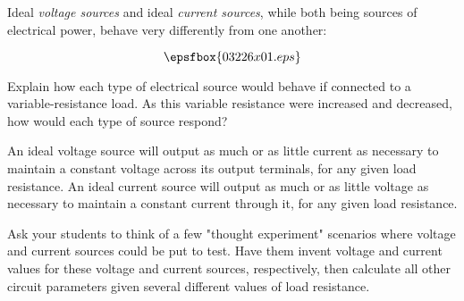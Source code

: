 

Ideal {\it voltage sources} and ideal {\it current sources}, while both being sources of electrical power, behave very differently from one another:

$$\epsfbox{03226x01.eps}$$

Explain how each type of electrical source would behave if connected to a variable-resistance load.  As this variable resistance were increased and decreased, how would each type of source respond?







An ideal voltage source will output as much or as little current as necessary to maintain a constant voltage across its output terminals, for any given load resistance.  An ideal current source will output as much or as little voltage as necessary to maintain a constant current through it, for any given load resistance.







Ask your students to think of a few "thought experiment" scenarios where voltage and current sources could be put to test.  Have them invent voltage and current values for these voltage and current sources, respectively, then calculate all other circuit parameters given several different values of load resistance.




